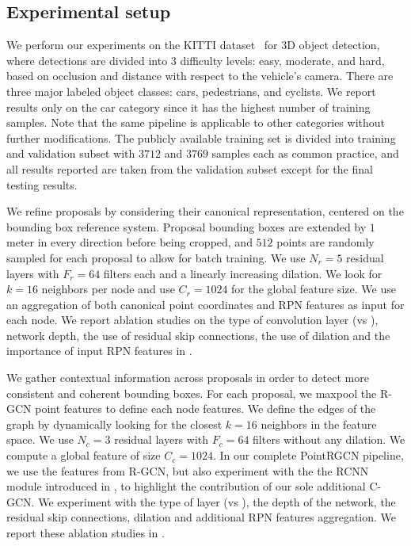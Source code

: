 \documentclass[10pt,twocolumn,letterpaper]{article}
\begin{document}
\subsection{Experimental setup}





We perform our experiments on the KITTI dataset~\cite{Geiger2012KITTI} for 3D object detection, where detections are divided into $3$ difficulty levels: easy, moderate, and hard, based on occlusion and distance with respect to the vehicle's camera.
There are three major labeled object classes: cars, pedestrians, and cyclists.
We report results only on the car category since it has the highest number of training samples.
Note that the same pipeline is applicable to other categories without further modifications.
The publicly available training set is divided into training and validation subset with $3712$ and $3769$ samples each as common practice, and all results reported are taken from the validation subset except for the final testing results.


We refine proposals by considering their canonical representation, centered on the bounding box reference system.
Proposal bounding boxes are extended by $1$ meter in every direction before being cropped, and $512$ points are randomly sampled for each proposal to allow for batch training.
We use $N_r=5$ residual \MRGCN layers with $F_r=64$ filters each and a linearly increasing dilation.
We look for $k=16$ neighbors per node and use $C_r=1024$ for the global feature size.
We use an aggregation of both canonical point coordinates and RPN features as input for each node.
We report ablation studies on the type of convolution layer (\ie \EdgeConv vs \MRGCN), network depth, the use of residual skip connections, the use of dilation and the importance of input RPN features in .


We gather contextual information across proposals in order to detect more consistent and coherent bounding boxes.
For each proposal, we maxpool the R-GCN point features to define each node features.
We define the edges of the graph by dynamically looking for the closest $k=16$ neighbors in the feature space.
We use $N_c = 3$ residual \EdgeConv layers with $F_c=64$ filters without any dilation.
We compute a global feature of size $C_c=1024$.
In our complete PointRGCN pipeline, we use the features from R-GCN, but also experiment with the the RCNN module introduced in \PointRCNN, to highlight the contribution of our sole additional C-GCN.
We experiment with the type of layer (\EdgeConv vs \MRGCN), the depth of the network, the residual skip connections, dilation and additional RPN features aggregation. 
We report these ablation studies in .
\end{document}
